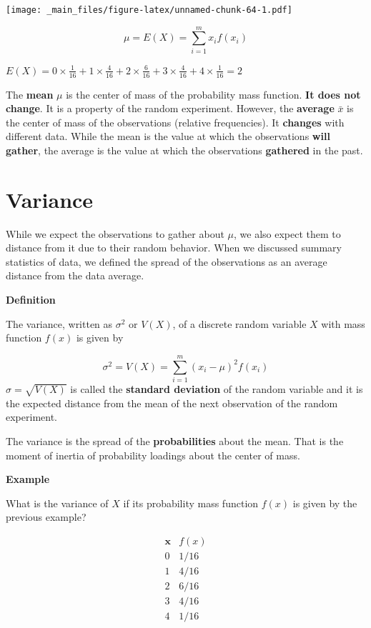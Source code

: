 \documentclass[
]{book}
\begin{document}
\texttt{[image: \_main\_files/figure-latex/unnamed-chunk-64-1.pdf]}

\[ \mu =E(X)=\sum_{i=1}^m x_i f(x_i) \]

\(E(X)=0 \times \frac{1}{16} + 1 \times \frac{4}{16} + 2 \times \frac{6}{16} + 3 \times \frac{4}{16} + 4 \times \frac{1}{16} =2\)

The \textbf{mean} \(\mu\) is the center of mass of the probability mass function. \textbf{It does not change}. It is a property of the random experiment. However, the \textbf{average} \(\bar{x}\) is the center of mass of the observations (relative frequencies). It \textbf{changes} with different data. While the mean is the value at which the observations \textbf{will gather}, the average is the value at which the observations \textbf{gathered} in the past.

\hypertarget{variance}{%
\section{Variance}\label{variance}}

While we expect the observations to gather about \(\mu\), we also expect them to distance from it due to their random behavior. When we discussed summary statistics of data, we defined the spread of the observations as an average distance from the data average.

\textbf{Definition}

The variance, written as \(\sigma^2\) or \(V(X)\), of a discrete random variable \(X\) with mass function \(f(x)\) is given by

\[\sigma^2 = V(X)= \sum_{i=1}^m (x_i-\mu)^2 f(x_i)\]
\(\sigma=\sqrt{V(X)}\) is called the \textbf{standard deviation} of the random variable and it is the expected distance from the mean of the next observation of the random experiment.

The variance is the spread of the \textbf{probabilities} about the mean. That is the moment of inertia of probability loadings about the center of mass.

\textbf{Example}

What is the variance of \(X\) if its probability mass function \(f(x)\) is given by the previous example?

\[
\begin{array}{cc}
\mathbf{x} & f(x) \\
0 & 1/16 \\
1 & 4/16 \\
2 & 6/16 \\
3 & 4/16 \\
4 & 1/16 \\
\end{array}
\]
\end{document}
